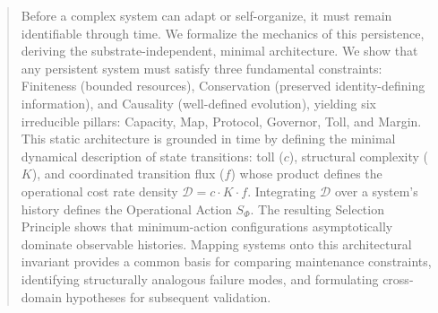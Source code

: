 \begin{abstract}
Before a complex system can adapt or self-organize, it must remain identifiable through time. We formalize the mechanics of this persistence, deriving the substrate-independent, minimal architecture. We show that any persistent system must satisfy three fundamental constraints: Finiteness (bounded resources), Conservation (preserved identity-defining information), and Causality (well-defined evolution), yielding six irreducible pillars: Capacity, Map, Protocol, Governor, Toll, and Margin. This static architecture is grounded in time by defining the minimal dynamical description of state transitions: toll ($c$), structural complexity ($K$), and coordinated transition flux ($f$) whose product defines the operational cost rate density $\mathcal{D} = c \cdot K \cdot f$. Integrating $\mathcal{D}$ over a system's history defines the Operational Action $S_{\Phi}$. The resulting Selection Principle shows that minimum-action configurations asymptotically dominate observable histories. Mapping systems onto this architectural invariant provides a common basis for comparing maintenance constraints, identifying structurally analogous failure modes, and formulating cross-domain hypotheses for subsequent validation.
\end{abstract}